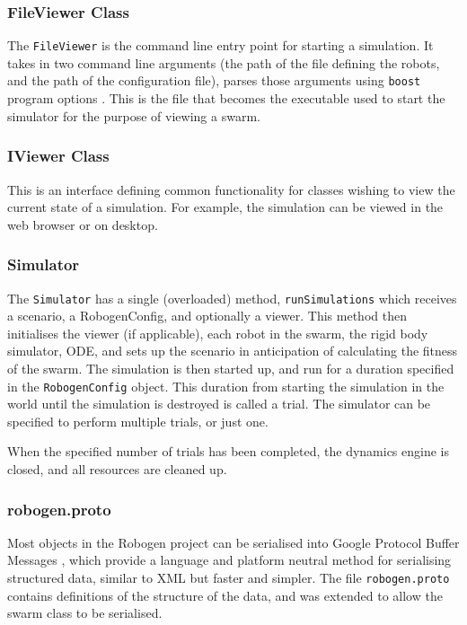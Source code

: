 \documentclass[11pt,a4paper]{article}
\begin{document}
\subsubsection{FileViewer Class}
The \texttt{FileViewer} is the command line entry point for starting a
simulation. It takes in two command line arguments (the path of the file
defining the robots, and the path of the configuration file), parses those
arguments using \texttt{boost} program options \cite{boost}. This is the file
that becomes the executable used to start the simulator for the purpose of
viewing a swarm.

\subsubsection{IViewer Class}
This is an interface defining common functionality for classes wishing to view
the current state of a simulation. For example, the simulation can be viewed in
the web browser or on desktop.

\subsubsection{Simulator}
The \texttt{Simulator} has a single (overloaded) method,
\texttt{runSimulations} which receives a scenario, a RobogenConfig, and
optionally a viewer. This method then initialises the viewer (if applicable),
each robot in the swarm, the rigid body simulator, ODE, and sets up the
scenario in anticipation of calculating the fitness of the swarm. The
simulation is then started up, and run for a duration specified in the
\texttt{RobogenConfig} object. This duration from starting the simulation in
the world until the simulation is destroyed is called a trial. The simulator
can be specified to perform multiple trials, or just one.

When the specified number of trials has been completed, the dynamics engine is
closed, and all resources are cleaned up.

\subsubsection{robogen.proto}
Most objects in the Robogen project can be serialised into Google Protocol Buffer
Messages \cite{protobuf}, which provide a language and platform neutral method
for serialising structured data, similar to XML but faster and simpler. The
file \texttt{robogen.proto} contains definitions of the structure of the data,
and was extended to allow the swarm class to be serialised.
\end{document}
